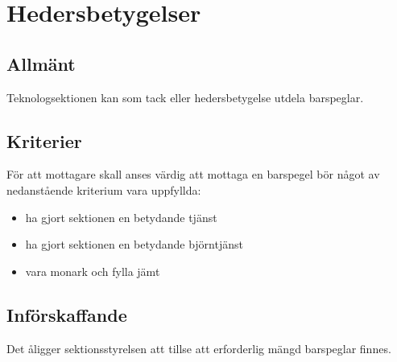\documentclass[a4paper]{dtek}
\begin{document}
\section{Hedersbetygelser}
\subsection{Allmänt}
Teknologsektionen kan som tack eller hedersbetygelse utdela barspeglar.
\subsection{Kriterier}
För att mottagare skall anses värdig att mottaga en barspegel bör något av nedanstående kriterium vara uppfyllda:
\begin{itemize}
\item ha gjort sektionen en betydande tjänst
\item ha gjort sektionen en betydande björntjänst
\item vara monark och fylla jämt
\end{itemize}
\subsection{Införskaffande}
Det åligger sektionsstyrelsen att tillse att erforderlig mängd barspeglar finnes.
\end{document}
